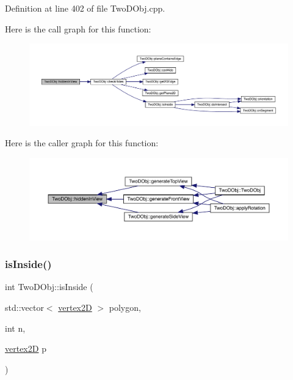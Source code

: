 Definition at line 402 of file Two\+D\+Obj.\+cpp.

Here is the call graph for this function\+:
\nopagebreak
\begin{figure}[H]
\begin{center}
\leavevmode
\includegraphics[width=350pt]{class_two_d_obj_ab0d27341367906fc4f4d9e5e8b4b8543_cgraph}
\end{center}
\end{figure}
Here is the caller graph for this function\+:
\nopagebreak
\begin{figure}[H]
\begin{center}
\leavevmode
\includegraphics[width=350pt]{class_two_d_obj_ab0d27341367906fc4f4d9e5e8b4b8543_icgraph}
\end{center}
\end{figure}
\mbox{\label{class_two_d_obj_a331a606153d723b8290bd885475bb1b5}} 
\subsubsection{\texorpdfstring{is\+Inside()}{isInside()}}
{\footnotesize\ttfamily int Two\+D\+Obj\+::is\+Inside (\begin{DoxyParamCaption}\item[{std\+::vector$<$ \mbox{\hyperlink{structvertex2_d}{vertex2D}} $>$}]{polygon,  }\item[{int}]{n,  }\item[{\mbox{\hyperlink{structvertex2_d}{vertex2D}}}]{p }\end{DoxyParamCaption})}



